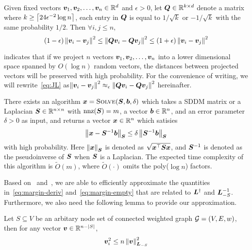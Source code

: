 \documentclass[sigconf]{acmart}
\begin{document}
\begin{lemma}\label{lem:JL}
    Given fixed vectors \(\boldsymbol{v}_1,\boldsymbol{v}_2,\dots,\boldsymbol{v}_n\in\mathbb{R}^d\) and \(\epsilon>0\), let \(\boldsymbol{Q}\in\mathbb{R}^{k\times d}\) denote a matrix where \(k\ge\left\lceil24\epsilon^{-2}\log n\right\rceil\), each entry in \(\boldsymbol{Q}\) is equal to \(1/\sqrt k\) or \(-1/\sqrt k\) with the same probability \(1/2\). Then \(\forall i,j\le n\),
    \begin{equation}\label{eq:JL}
        (1-\epsilon)\left\Vert\boldsymbol{v}_i-\boldsymbol{v}_j\right\Vert^2\le\left\Vert\boldsymbol{Q}\boldsymbol{v}_i-\boldsymbol{Q}\boldsymbol{v}_j\right\Vert^2\le(1+\epsilon)\left\Vert\boldsymbol{v}_i-\boldsymbol{v}_j\right\Vert^2
    \end{equation}
\end{lemma}
 indicates that if we project \(n\) vectors \(\boldsymbol{v}_1,\boldsymbol{v}_2,\dots,\boldsymbol{v}_n\) into a lower dimensional space spanned by \(O(\log n)\) random vectors, the distances between projected vectors will be preserved with high probability.
For the convenience of writing, we will rewrite~\eqref{eq:JL} as\(\left\Vert\boldsymbol{v}_i-\boldsymbol{v}_j\right\Vert^2\approx_\epsilon\left\Vert\boldsymbol{Q}\boldsymbol{v}_i-\boldsymbol{Q}\boldsymbol{v}_j\right\Vert^2\) hereinafter.

\begin{lemma}\label{lem:solver}
    There exists an algorithm \(\boldsymbol{x}=\textsc{Solve}(\boldsymbol{S},\boldsymbol{b},\delta)\) which takes a SDDM matrix or a Laplacian \(\boldsymbol{S}\in\mathbb{R}^{n\times n}\) with \(\text{nnz}(\boldsymbol{S})=m\), a vector \(\boldsymbol{b}\in\mathbb{R}^n\), and an error parameter \(\delta>0\) as input, and returns a vector \(\boldsymbol{x}\in\mathbb{R}^n\) which satisies
    \[\left\Vert\boldsymbol{x}-\boldsymbol{S}^{-1}\boldsymbol{b}\right\Vert_{\boldsymbol{S}}\le\delta\left\Vert\boldsymbol{S}^{-1}\boldsymbol{b}\right\Vert_{\boldsymbol{S}}\]
    with high probability.
    Here \(\left\Vert\boldsymbol{x}\right\Vert_{\boldsymbol{S}}\) is denoted as \(\sqrt{\boldsymbol{x}^\top\boldsymbol{S}\boldsymbol{x}}\), and \(\boldsymbol{S}^{-1}\) is denoted as the pseudoinverse of \(\boldsymbol{S}\) when \(\boldsymbol{S}\) is a Laplacian.
    The expected time complexity of this algorithm is \(\tilde{O}(m)\), where \(\tilde{O}(\cdot)\) omits the poly(\(\log n\)) factors.

\end{lemma}

Based on~ and~, we are able to efficiently approximate the quantities in~\eqref{eq:margin-deriv} and~\eqref{eq:margin-empty} that are related to \(\boldsymbol{L}^\dagger\) and \(\boldsymbol{L}_{-S}^{-1}\).
Furthermore, we also need the following lemma to provide our approximation.

\begin{lemma}\label{lem:norm-comp}
    Let \(S\subseteq V\) be an arbitary node set of connected weighted graph \(\mathcal{G}=(V,E,w)\), then for any vector \(\boldsymbol{v}\in\mathbb{R}^{n-\left|S \right|}\),
    \[\boldsymbol{v}_i^2\le n\left\Vert\boldsymbol{v}\right\Vert_{\boldsymbol{L}_{-S}}^2\]
\end{lemma}
\end{document}

